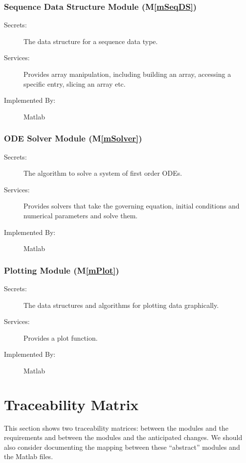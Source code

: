 \documentclass[12pt]{article}
\newcommand{\mref}[1]{M\ref{#1}}
\begin{document}
\subsubsection{Sequence Data Structure Module (\mref{mSeqDS})}

\begin{description}
\item[Secrets:] The data structure for a sequence data type.
\item[Services:] Provides array manipulation, including building an array,
  accessing a specific entry, slicing an array etc.
\item[Implemented By:] Matlab
\end{description}

\subsubsection{ODE Solver Module (\mref{mSolver})}

\begin{description}
\item[Secrets:] The algorithm to solve a system of first order ODEs.
\item[Services:] Provides solvers that take the governing equation, initial
  conditions and numerical parameters and solve them.
\item[Implemented By:] Matlab
\end{description}

\subsubsection{Plotting Module (\mref{mPlot})}

\begin{description}
\item[Secrets:] The data structures and algorithms for plotting data graphically.
\item[Services:] Provides a plot function.
\item[Implemented By:] Matlab
\end{description}

\section{Traceability Matrix} \label{SecTM}

This section shows two traceability matrices: between the modules and the
requirements and between the modules and the anticipated changes.  We should
also consider documenting the mapping between these ``abstract'' modules and the
Matlab files.
\end{document}
